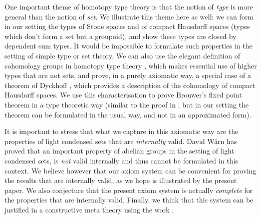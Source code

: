 One important theme of homotopy type theory is that the notion of {\em type} is more general than the notion of {\em set}. We illustrate
this theme here as well: we can form in our setting the types of Stone spaces and of compact Hausdorff spaces
(types which don't form a set but a groupoid),
and show these types are
closed by dependent sum types. It would be impossible to formulate such properties in the setting of simple type or set theory.
We can also use the elegant definition of cohomology groups in homotopy type theory \cite{hott}, which makes essential
use of higher types that are not sets, and prove, in a purely axiomatic way,
a special case of a theorem of Dyckhoff \cite{dyckhoff76}, which provides
a description of the cohomology of compact Hausdorff spaces. We use this characterisation to prove Brouwer's fixed point theorem
in a type theoretic way (similar to the proof in \cite{shulman-Brouwer-fixed-point}, but
in our setting the theorem can be formulated in the usual
way, and not in an approximated form).

It is important to stress that what we capture in this axiomatic way are the properties of light condensed
sets that are {\em internally} valid. David W\"arn \cite{warn2024} has proved that an important property of abelian
groups in the setting of light condensed sets, is {\em not} valid internally and thus cannot be formulated in this context.
We believe however that our axiom system can be convenient for proving the results that are internally valid, as we hope
is illustrated by the present paper. We also conjecture that the present axiom system is actually {\em complete}
for the properties that are internally valid. Finally, we think that this system can be justified in a constructive meta theory
using the work \cite{CRS21}.
